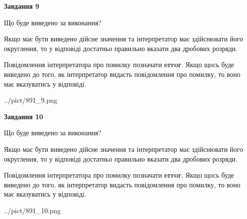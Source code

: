 \documentclass[12pt, ukrainian]{article}
\begin{document}
{\begin {Large}
{\begin {center}\textbf{Завдання 9}\end {center}}\par
Що буде виведено за виконання? \par

Якщо має бути виведено дійсне значення та інтерпретатор має здійснювати його округлення, 
то у відповіді достатньо правильно вказати два дробових розряди.

Повідомлення інтерпретатора про помилку позначати \textbf{error}.
Якщо щось буде виведено до того, як інтерпретатор видасть повідомлення про помилку, 
то воно має вказуватись у відповіді. \par

\begin{center}
	{../pict/891_9.png}
\end{center}
\newpage

{\begin {center}\textbf{Завдання 10}\end {center}}\par
Що буде виведено за виконання? \par

Якщо має бути виведено дійсне значення та інтерпретатор має здійснювати його округлення, 
то у відповіді достатньо правильно вказати два дробових розряди.

Повідомлення інтерпретатора про помилку позначати \textbf{error}.
Якщо щось буде виведено до того, як інтерпретатор видасть повідомлення про помилку, 
то воно має вказуватись у відповіді. \par

\begin{center}
	{../pict/891_10.png}
\end{center}
\newpage

\end {Large}}
\end{document}
